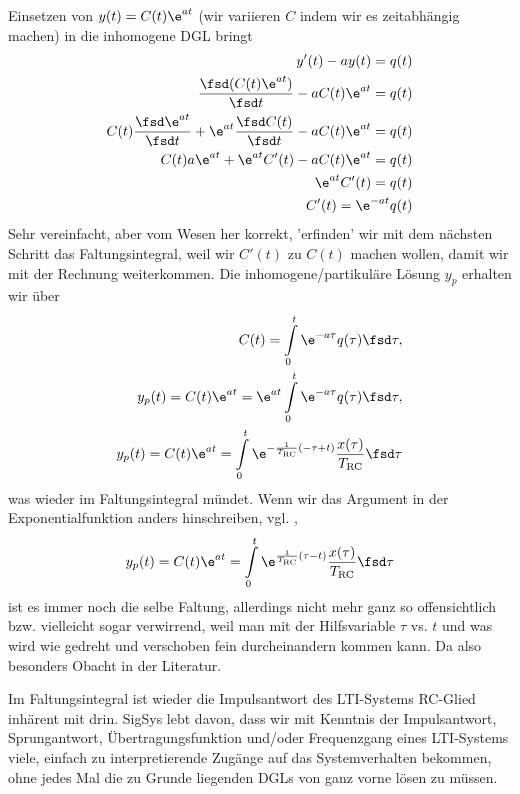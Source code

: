 Einsetzen von $y(t) = C(t) \e^{a t}$ (wir variieren $C$ indem wir es zeitabhängig machen) in die inhomogene DGL bringt
\begin{align}
y'(t) - a y(t) = q(t)\\
\frac{\fsd (C(t) \e^{a t})}{\fsd t} - a C(t) \e^{a t} = q(t)\\
C(t) \frac{\fsd \e^{a t}}{\fsd t} + \e^{a t} \frac{\fsd C(t)}{\fsd t} - a C(t) \e^{a t} = q(t)\\
C(t) a \e^{a t} + \e^{a t} C'(t) - a C(t) \e^{a t} = q(t)\\
\e^{a t} C'(t) = q(t)\\
C'(t) = \e^{-a t} q(t)
\end{align}
Sehr vereinfacht, aber vom Wesen her korrekt, 'erfinden' wir mit dem nächsten Schritt das Faltungsintegral, weil wir $C'(t)$ zu $C(t)$ machen wollen, damit wir mit der Rechnung weiterkommen.
Die inhomogene/partikuläre Lösung $y_p$ erhalten wir über
\begin{align}
C(t) = \int\limits_{0}^{t} \e^{-a \tau} q(\tau) \fsd\tau,\\
y_p(t) = C(t) \e^{a t} = \e^{a t}\int\limits_{0}^{t} \e^{-a \tau} q(\tau) \fsd\tau,\\
y_p(t) = C(t) \e^{a t} = \int\limits_{0}^{t} \e^{-\frac{1}{\TRC} (-\tau+t)} \frac{x(\tau)}{\TRC} \fsd\tau
\end{align}
was wieder im Faltungsintegral mündet.
Wenn wir das Argument in der Exponentialfunktion anders hinschreiben, vgl. \cite[Anhang A.2]{Paull2017},
\begin{align}
y_p(t) = C(t) \e^{a t} = \int\limits_{0}^{t} \e^{\frac{1}{\TRC} (\tau-t)} \frac{x(\tau)}{\TRC} \fsd\tau
\end{align}
ist es immer noch die selbe Faltung, allerdings nicht mehr ganz so offensichtlich bzw. vielleicht sogar verwirrend, weil man mit der Hilfsvariable $\tau$ vs. $t$ und was wird wie gedreht und verschoben fein durcheinandern kommen kann. Da also besonders Obacht in der Literatur.
%

Im Faltungsintegral ist wieder die Impulsantwort des LTI-Systems RC-Glied inhärent mit drin.
%
SigSys lebt davon, dass wir mit Kenntnis der Impulsantwort, Sprungantwort, Übertragungsfunktion und/oder Frequenzgang eines LTI-Systems viele, einfach zu interpretierende Zugänge auf das Systemverhalten bekommen, ohne jedes Mal die zu Grunde liegenden DGLs von ganz vorne lösen zu müssen.
